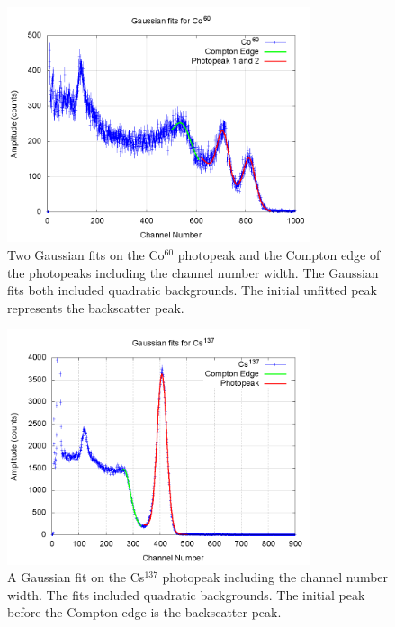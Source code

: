 \documentclass[aps,prl,twocolumn,superscriptaddress,nofootinbib]{revtex4-1}
\begin{document}
\begin{figure}[h!]
  \begin{center}
\centerline{\includegraphics[width=3.5in]{cocomp.png}}
\caption{ \small{Two Gaussian fits on the Co$^{60}$ photopeak and the Compton edge of the photopeaks including the channel number width. The Gaussian fits both included quadratic backgrounds. The initial unfitted peak represents the backscatter peak. \label{fig5}}}
  \end{center}
\end{figure}
\vfill\eject
\begin{figure}[h!]
  \begin{center}
\centerline{\includegraphics[width=3.5in]{cscomp.png}}
\caption{ \small{A Gaussian fit on the Cs$^{137}$ photopeak including the channel number width. The fits included quadratic backgrounds. The initial peak before the Compton edge is the backscatter peak. \label{fig6}}}
  \end{center}
\end{figure}
\end{document}
